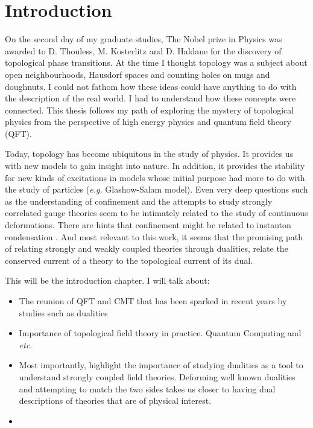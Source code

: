 
    \graphicspath{{Introduction_Folder/figures/PNG/}{Introduction_Folder/figures/PDF/}{Introduction_Folder/figures/}}

\chapter*{Introduction}

On the second day of my graduate studies, The Nobel prize in Physics was awarded to D. Thouless, M. Kosterlitz and D. Haldane for the discovery of topological phase transitions. At the time I thought topology was a subject about open neighbourhoods, Hausdorf spaces and counting holes on mugs and doughnuts. I could not fathom how these ideas could have anything to do with the description of the real world. I had to understand how these concepts were connected. This thesis follows my path of exploring the mystery of topological physics from the perspective of high energy physics and quantum field theory (QFT).

Today, topology has become ubiquitous in the study of physics. It provides us with new models to gain insight into nature. In addition, it provides the stability for new kinds of excitations in models whose initial purpose had more to do with the study of particles (\textit{e.g.} Glashow-Salam model). Even very deep questions such as the understanding of confinement and the attempts to study strongly correlated gauge theories seem to be intimately related to the study of continuous deformations. There are hints that confinement might be related to instanton condensation \cite{Polyakov1977}. And most relevant to this work, it seems that the promising path of relating strongly and weakly coupled theories through dualities, relate the conserved current of a theory to the topological current of its dual.

This will be the introduction chapter. I will talk about:



\begin{itemize}
    \item The reunion of QFT and CMT that has been sparked in recent years by studies such as dualities
    \item Importance of topological field theory in practice. Quantum Computing and \textit{etc}. 
    \item Most importantly, highlight the importance of studying dualities as a tool to understand strongly coupled field theories. Deforming well known dualities and attempting to match the two sides takes us closer to having dual descriptions of theories that are of physical interest.
    \item 
\end{itemize}
